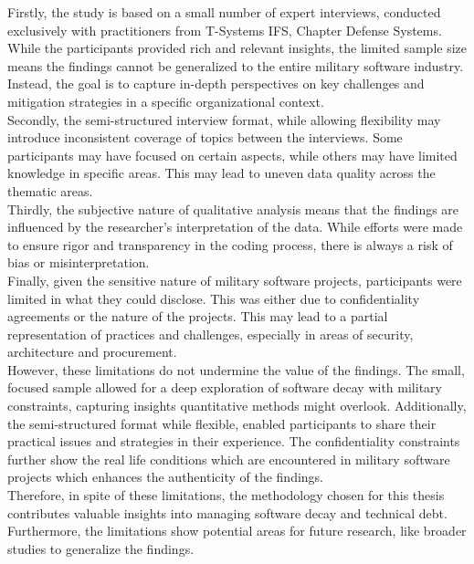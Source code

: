 Firstly, the study is based on a small number of expert interviews, conducted exclusively with practitioners from T-Systems IFS, Chapter Defense Systems. While the participants provided rich and relevant insights, the limited sample size means the findings cannot be generalized to the entire military software industry. 
Instead, the goal is to capture in-depth perspectives on key challenges and mitigation strategies in a specific organizational context.\\

Secondly, the semi-structured interview format, while allowing flexibility may introduce inconsistent coverage of topics between the interviews. Some participants may have focused on certain aspects, while others may have limited knowledge in specific areas. This may lead to uneven data quality across the thematic areas.\\

Thirdly, the subjective nature of qualitative analysis means that the findings are influenced by the researcher's interpretation of the data. While efforts were made to ensure rigor and transparency in the coding process, there is always a risk of bias or misinterpretation.\\

Finally, given the sensitive nature of military software projects, participants were limited in what they could disclose. This was either due to confidentiality agreements or the nature of the projects. This may lead to a partial representation of practices and challenges, especially in areas of security, architecture and procurement.\\

However, these limitations do not undermine the value of the findings. The small, focused sample allowed for a deep exploration of software decay with military constraints, capturing insights quantitative methods might overlook. Additionally, the semi-structured format
while flexible, enabled participants to share their practical issues and strategies in their experience. The confidentiality constraints further show the real life conditions which are encountered in military software projects which enhances the authenticity of the findings.\\

Therefore, in spite of these limitations, the methodology chosen for this thesis contributes valuable insights into managing software decay and technical debt. Furthermore, the limitations show potential areas for future research, like broader studies to generalize the findings.

